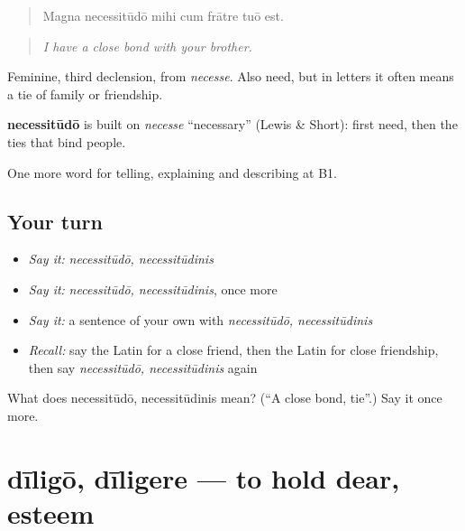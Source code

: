 \begin{quote}
Magna necessitūdō mihi cum frātre tuō est.
\end{quote}

\begin{quote}
\emph{I have a close bond with your brother.}
\end{quote}

Feminine, third declension, from \emph{necesse}. Also need, but in letters it often means a tie of family or friendship.

\begin{cousinweb}
\textbf{necessitūdō} is built on \emph{necesse} \textquotedblleft{}necessary\textquotedblright{} (Lewis \& Short): first need, then the ties that bind people.
\end{cousinweb}

\begin{grammarlens}[title={What you've built}]
One more word for telling, explaining and describing at B1.
\end{grammarlens}

\subsection*{Your turn}
\begin{itemize}
\raggedright
  \item \emph{Say it:} \emph{necessitūdō, necessitūdinis}
  \item \emph{Say it:} \emph{necessitūdō, necessitūdinis}, once more
  \item \emph{Say it:} a sentence of your own with \emph{necessitūdō, necessitūdinis}
  \item \emph{Recall:} say the Latin for a close friend, then the Latin for close friendship, then say \emph{necessitūdō, necessitūdinis} again
\end{itemize}

\begin{tcolorbox}[breakable,colback=teal!4,colframe=teal!35!black,title={Before you move on}]
What does necessitūdō, necessitūdinis mean? (\textquotedblleft{}A close bond, tie\textquotedblright{}.) Say it once more.
\end{tcolorbox}
\section[dīligō, dīligere]{dīligō, dīligere — to hold dear, esteem}

\label{lesson:LA-C533-diligo}



